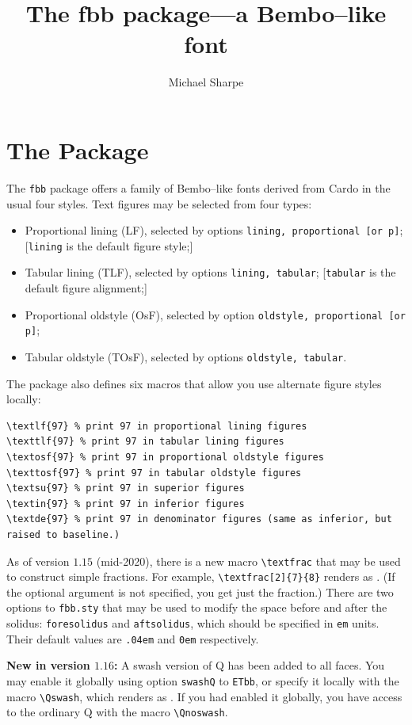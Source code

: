 \documentclass{article}
\title{The \textbf{fbb} package---a Bembo--like font}
\author{Michael Sharpe}
\date{}
\begin{document}
\maketitle
\section{The Package}
The {\tt fbb} package offers a family of Bembo--like fonts derived from Cardo in the usual four styles. Text figures may be selected from four types:
\begin{itemize}
\item
Proportional lining (LF), selected by options {\tt lining, proportional [or p]}; [{\tt lining} is the default figure style;]
\item
Tabular lining (TLF), selected by options {\tt lining, tabular}; [{\tt tabular} is the default figure alignment;]
\item
Proportional oldstyle (OsF), selected by option {\tt oldstyle, proportional [or p]};
\item
Tabular oldstyle (TOsF), selected by options {\tt oldstyle, tabular}.
\end{itemize}
The package also defines six macros that allow you use alternate figure styles locally:
\begin{verbatim}
\textlf{97} % print 97 in proportional lining figures
\texttlf{97} % print 97 in tabular lining figures
\textosf{97} % print 97 in proportional oldstyle figures
\texttosf{97} % print 97 in tabular oldstyle figures
\textsu{97} % print 97 in superior figures
\textin{97} % print 97 in inferior figures
\textde{97} % print 97 in denominator figures (same as inferior, but raised to baseline.)
\end{verbatim}
As of version $1.15$ (mid-2020), there is a new macro \verb|\textfrac| that may be used to construct simple fractions. For example, \verb|\textfrac[2]{7}{8}| renders as . (If the optional argument is not specified, you get just the fraction.) There are two options to {\tt fbb.sty} that may be used to modify the space before and after the solidus: {\tt foresolidus} and {\tt aftsolidus}, which should be specified in {\tt em} units. Their default values are {\tt .04em} and {\tt 0em} respectively.

\textbf{New in version $1.16$:} A swash version of Q has been added to all faces. You may enable it globally using option {\tt swashQ} to {\tt ETbb}, or specify it locally with the macro \verb|\Qswash|, which renders as \Qswash. If you had enabled it globally, you have access to the ordinary Q with the macro \verb|\Qnoswash|.
\end{document}
